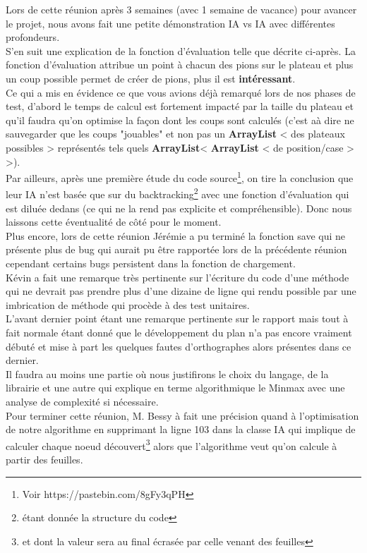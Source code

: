 \documentclass[11pt,a4paper]{article}
\begin{document}
    Lors de cette réunion après 3 semaines (avec 1 semaine de vacance) pour avancer le projet, nous avons fait une petite démonstration IA vs IA avec différentes profondeurs. \\
    S'en suit une explication de la fonction d'évaluation telle que décrite ci-après. La fonction d'évaluation attribue un point à chacun des pions sur le plateau et plus un coup possible permet de créer de pions, plus il est \textbf{intéressant}. \\ 
    Ce qui a mis en évidence ce que vous avions déjà remarqué lors de nos phases de test, d'abord le temps de calcul est fortement impacté par la taille du plateau et qu'il faudra qu'on optimise la façon dont les coups sont calculés (c'est aà dire ne sauvegarder que les coups "jouables" et non pas un \textbf{ArrayList} < des plateaux possibles > représentés tels quels \textbf{ArrayList}< \textbf{ArrayList} < de position/case > >).\\
    Par ailleurs, après une première étude du code source\footnote{Voir https://pastebin.com/8gFy3qPH}, on tire la conclusion que leur IA n'est basée que sur du backtracking\footnote{étant donnée la structure du code} avec une fonction d'évaluation qui est diluée dedans (ce qui ne la rend pas explicite et compréhensible). Donc nous laissons cette éventualité de côté pour le moment.\\
    Plus encore, lors de cette réunion Jérémie a pu terminé la fonction save qui ne présente plus de bug qui aurait pu être rapportée lors de la précédente réunion cependant certains bugs persistent dans la fonction de chargement.\\
    Kévin a fait une remarque très pertinente sur l'écriture du code d'une méthode qui ne devrait pas prendre plus d'une dizaine de ligne qui rendu possible par une imbrication de méthode qui procède à des test unitaires.\\
    L'avant dernier point étant une remarque pertinente sur le rapport mais tout à fait normale étant donné que le développement du plan n'a pas encore vraiment débuté et mise à part les quelques fautes d'orthographes alors présentes dans ce dernier.\\
    Il faudra au moins une partie où nous justifirons le choix du langage, de la librairie et une autre qui explique en terme algorithmique le Minmax avec une analyse de complexité si nécessaire.\\
    Pour terminer cette réunion, M. Bessy à fait une précision quand à l'optimisation de notre algorithme en supprimant la ligne 103 dans la classe IA qui implique de calculer chaque noeud découvert\footnote{et dont la valeur sera au final écrasée par celle venant des feuilles} alors que l'algorithme veut qu'on calcule à partir des feuilles.\\
    
\end{document}
